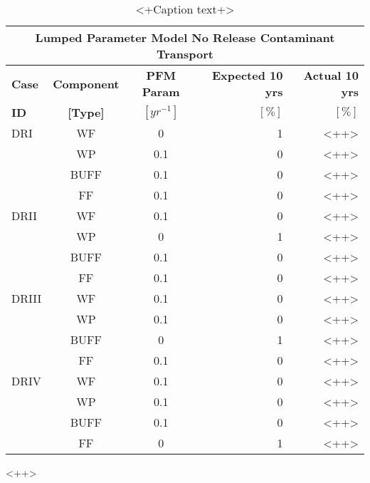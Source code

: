 \begin{table}
\centering
\footnotesize{
\begin{tabularx}{\textwidth}{|X|c|c|r|r|}
  \multicolumn{5}{c}{\textbf{Lumped Parameter Model No Release Contaminant Transport}} \\
  \hline
  \textbf{Case}  &  \textbf{Component} &  \textbf{PFM Param} & \textbf{Expected 10 yrs} & \textbf{Actual 10 yrs} \\
  \textbf{ID}    & \textbf{[Type]} &  \textbf{$[yr^{-1}]$}  &  $[\%]$  & $[\%]$ \\
  \hline
  DRI     &  WF    &  0   & 1 & <++> \\
          &  WP    &  0.1 & 0 & <++> \\
          &  BUFF  &  0.1 & 0 & <++> \\
          &  FF    &  0.1 & 0 & <++> \\
  \hline
  DRII    &  WF    &  0.1 & 0 & <++> \\
          &  WP    &  0   & 1 & <++> \\
          &  BUFF  &  0.1 & 0 & <++> \\
          &  FF    &  0.1 & 0 & <++> \\
  \hline
  DRIII   &  WF    &  0.1 & 0 & <++> \\
          &  WP    &  0.1 & 0 & <++> \\
          &  BUFF  &  0   & 1 & <++> \\
          &  FF    &  0.1 & 0 & <++> \\
  \hline
  DRIV    &  WF    &  0.1 & 0 & <++> \\
          &  WP    &  0.1 & 0 & <++> \\
          &  BUFF  &  0.1 & 0 & <++> \\
          &  FF    &  0   & 1 & <++> \\
  \hline
\end{tabularx}
\caption{<+Caption text+>}
\label{tab:<+label+>}
}
\end{table}<++>

